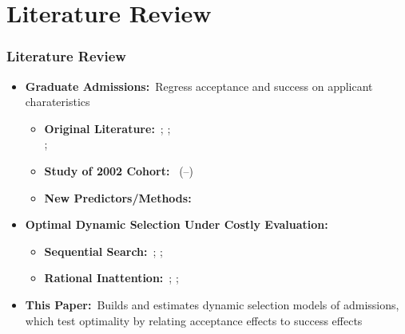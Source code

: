 \documentclass[12pt, aspectratio=169]{beamer}
\begin{document}
\section*{Literature Review}
\begin{frame}[label=lr]
\frametitle{Literature Review}
\begin{itemize}
\item \textbf{Graduate Admissions:}\ Regress acceptance and success on applicant charateristics\!
\vspace{5pt}
\begin{itemize}
\item \textbf{Original Literature:}\ \citet{attiyeh1997}; \citet{krueger2000}; \\ \citet{grovewu2007}; \citet{athey2007}
\vspace{5pt}
\item \textbf{Study of 2002 Cohort:}\ \citeauthor{stock2006} (\citeyear{stock2006}--\citeyear{stock2015})
\vspace{5pt}
\item \textbf{New Predictors/Methods:}\ \citet{bai2022}
\vspace{10pt}
\end{itemize}
\item \textbf{Optimal Dynamic Selection Under Costly Evaluation:}
\vspace{5pt}
\begin{itemize}
\item \textbf{Sequential Search:}\ \citet{mccall1970}; \citet{mortensen1970}; \citet{weitzman1979}
\vspace{5pt}
\item \textbf{Rational Inattention:}\ \citet{sims2003}; \citet{matejka2015}; \citet{caplin2015}\!\!\!\!\!\!\!
\vspace{10pt}
\end{itemize}
\item[$\bigstar$] \textbf{This Paper:}\ Builds and estimates dynamic selection models of admissions, \\ which test optimality by relating acceptance effects to success effects
\end{itemize}
\end{frame}
\end{document}
